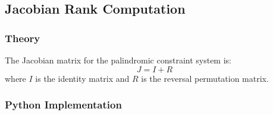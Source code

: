 \documentclass[11pt,a4paper]{article}
\begin{document}
\subsection{Jacobian Rank Computation}

\subsubsection{Theory}

The Jacobian matrix for the palindromic constraint system is:
\begin{equation}
J = I + R
\end{equation}
where $I$ is the identity matrix and $R$ is the reversal permutation matrix.

\subsubsection{Python Implementation}
\end{document}
